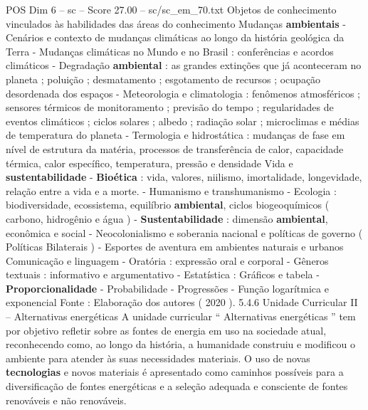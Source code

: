 \begin{textsample}{POS Dim 6 – sc – Score 27.00 – sc/sc\_em\_70.txt}
Objetos de conhecimento vinculados às habilidades das áreas do conhecimento Mudanças \textbf{ambientais} - Cenários e contexto de mudanças climáticas ao longo da história geológica da Terra - Mudanças climáticas no Mundo e no Brasil : conferências e acordos climáticos - Degradação \textbf{ambiental} : as grandes extinções que já aconteceram no planeta ; poluição ; desmatamento ; esgotamento de recursos ; ocupação desordenada dos espaços - Meteorologia e climatologia : fenômenos atmosféricos ; sensores térmicos de monitoramento ; previsão do tempo ; regularidades de eventos climáticos ; ciclos solares ; albedo ; radiação solar ; microclimas e médias de temperatura do planeta - Termologia e hidrostática : mudanças de fase em nível de estrutura da matéria, processos de transferência de calor, capacidade térmica, calor específico, temperatura, pressão e densidade Vida e \textbf{sustentabilidade} - \textbf{Bioética} : vida, valores, niilismo, imortalidade, longevidade, relação entre a vida e a morte. - Humanismo e transhumanismo - Ecologia : biodiversidade, ecossistema, equilíbrio \textbf{ambiental}, ciclos biogeoquímicos ( carbono, hidrogênio e água ) - \textbf{Sustentabilidade} : dimensão \textbf{ambiental}, econômica e social - Neocolonialismo e soberania nacional e políticas de governo ( Políticas Bilaterais ) - Esportes de aventura em ambientes naturais e urbanos Comunicação e linguagem - Oratória : expressão oral e corporal - Gêneros textuais : informativo e argumentativo - Estatística : Gráficos e tabela - \textbf{Proporcionalidade} - Probabilidade - Progressões - Função logarítmica e exponencial Fonte : Elaboração dos autores ( 2020 ). 5.4.6 Unidade Curricular II – Alternativas energéticas A unidade curricular “ Alternativas energéticas ” tem por objetivo refletir sobre as fontes de energia em uso na sociedade atual, reconhecendo como, ao longo da história, a humanidade construiu e modificou o ambiente para atender às suas necessidades materiais.
O uso de novas \textbf{tecnologias} e novos materiais é apresentado como caminhos possíveis para a diversificação de fontes energéticas e a seleção adequada e consciente de fontes renováveis e não renováveis.

\end{textsample}
